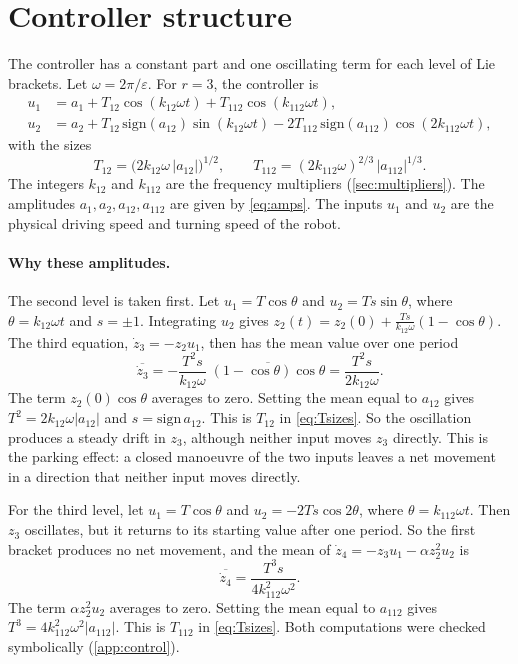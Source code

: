 \section{Controller structure}
\label{sec:structure}

The controller has a constant part and one oscillating term for each level of
Lie brackets. Let $\omega=2\pi/\varepsilon$. For $r=3$, the controller is
\begin{align}
  u_1&=a_1+T_{12}\cos(k_{12}\omega t)+T_{112}\cos(k_{112}\omega t),\\
  u_2&=a_2+T_{12}\,\mathrm{sign}(a_{12})\sin(k_{12}\omega t)
        -2T_{112}\,\mathrm{sign}(a_{112})\cos(2k_{112}\omega t),
  \label{eq:controller}
\end{align}
with the sizes
\begin{equation}
  T_{12}=\bigl(2k_{12}\omega\,|a_{12}|\bigr)^{1/2},\qquad
  T_{112}=(2k_{112}\omega)^{2/3}\,|a_{112}|^{1/3}.
  \label{eq:Tsizes}
\end{equation}
The integers $k_{12}$ and $k_{112}$ are the frequency multipliers
(\cref{sec:multipliers}). The amplitudes $a_1,a_2,a_{12},a_{112}$ are given
by \eqref{eq:amps}. The inputs $u_1$ and $u_2$ are the physical driving speed and
turning speed of the robot.

\paragraph{Why these amplitudes.}
The second level is taken first. Let $u_1=T\cos\theta$ and $u_2=Ts\sin\theta$,
where $\theta=k_{12}\omega t$ and $s=\pm1$. Integrating $u_2$ gives
$z_2(t)=z_2(0)+\frac{Ts}{k_{12}\omega}(1-\cos\theta)$. The third equation,
$\dot z_3=-z_2u_1$, then has the mean value over one period
\begin{equation}
  \overline{\dot z_3}=-\frac{T^2s}{k_{12}\omega}\;\overline{(1-\cos\theta)\cos\theta}
  =\frac{T^2s}{2k_{12}\omega}.
\end{equation}
The term $z_2(0)\cos\theta$ averages to zero. Setting the mean equal to $a_{12}$
gives $T^2=2k_{12}\omega|a_{12}|$ and $s=\mathrm{sign}\,a_{12}$. This is $T_{12}$
in \eqref{eq:Tsizes}. So the oscillation produces a steady drift in $z_3$,
although neither input moves $z_3$ directly. This is the parking effect: a closed
manoeuvre of the two inputs leaves a net movement in a direction that neither
input moves directly.

For the third level, let $u_1=T\cos\theta$ and $u_2=-2Ts\cos2\theta$, where
$\theta=k_{112}\omega t$. Then $z_3$ oscillates, but it returns to its starting
value after one period. So the first bracket produces no net movement, and the
mean of $\dot z_4=-z_3u_1-\alpha z_2^2u_2$ is
\begin{equation}
  \overline{\dot z_4}=\frac{T^3s}{4k_{112}^2\omega^2}.
\end{equation}
The term $\alpha z_2^2u_2$ averages to zero. Setting the mean equal to $a_{112}$
gives $T^3=4k_{112}^2\omega^2|a_{112}|$. This is $T_{112}$ in
\eqref{eq:Tsizes}. Both computations were checked symbolically
(\cref{app:control}).

